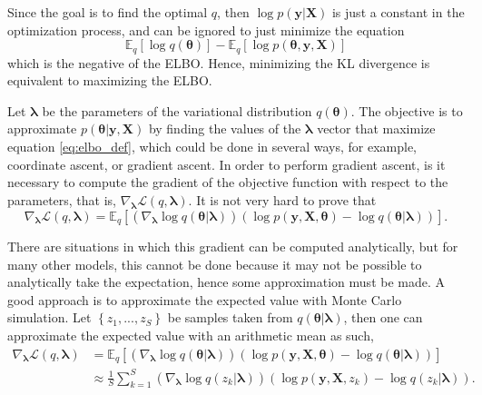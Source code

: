Since the goal is to find the optimal $q$, then $\log p(\boldsymbol{y} | \boldsymbol{X})$ is just a constant in the optimization process, and can be ignored to just minimize the equation
\begin{equation}
  \mathbb{E}_q \left[ \log  q(\boldsymbol{\theta}) \right] - \mathbb{E}_q \left[ \log p(\boldsymbol{\theta}, \boldsymbol{y}, \boldsymbol{X}) \right]
\end{equation}
which is the negative of the ELBO. Hence, minimizing the KL divergence is equivalent to maximizing the ELBO.

Let $\boldsymbol{\lambda}$ be the parameters of the variational distribution $q(\boldsymbol{\theta})$. The objective is to approximate $p(\boldsymbol{\theta} | \boldsymbol{y}, \boldsymbol{X})$ by finding the values of the $\boldsymbol{\lambda}$ vector that maximize equation \eqref{eq:elbo_def}, which could be done in several ways, for example, coordinate ascent, or gradient ascent. In order to perform gradient ascent, is it necessary to compute the gradient of the objective function with respect to the parameters, that is, $\nabla_{\boldsymbol{\lambda}} \mathcal{L}(q, \boldsymbol{\lambda})$. It is not very hard to prove that
\begin{equation}
  \label{eq:ELBO_gradient}
  \nabla_{\boldsymbol{\lambda}} \mathcal{L}(q, \boldsymbol{\lambda}) =
  \mathbb{E}_q \left[ \left( \nabla_{\boldsymbol{\lambda}} \log q(\boldsymbol{\theta} | \boldsymbol{\lambda}) \right) \left( \log p(\boldsymbol{y}, \boldsymbol{X}, \boldsymbol{\theta}) - \log q(\boldsymbol{\theta} | \boldsymbol{\lambda}) \right) \right].
\end{equation}

There are situations in which this gradient can be computed analytically, but for many other models, this cannot be done because it may not be possible to analytically take the expectation, hence some approximation must be made. A good approach is to approximate the expected value with Monte Carlo simulation. Let $\left\{ z_1, ..., z_S \right\}$ be samples taken from $q(\boldsymbol{\theta} | \boldsymbol{\lambda})$, then one can approximate the expected value with an arithmetic mean as such,
\begin{equation}
  \begin{split}
  \nabla_{\boldsymbol{\lambda}} \mathcal{L}(q, \boldsymbol{\lambda}) &=
  \mathbb{E}_q \left[ \left( \nabla_{\boldsymbol{\lambda}} \log q(\boldsymbol{\theta} | \boldsymbol{\lambda}) \right) \left( \log p(\boldsymbol{y}, \boldsymbol{X}, \boldsymbol{\theta}) - \log q(\boldsymbol{\theta} | \boldsymbol{\lambda}) \right) \right] \\
  & \approx \frac{1}{S} \sum_{k = 1}^S \left( \nabla_{\boldsymbol{\lambda}} \log q(z_k | \boldsymbol{\lambda}) \right) \left( \log p(\boldsymbol{y}, \boldsymbol{X}, z_k) - \log q(z_k | \boldsymbol{\lambda}) \right).
  \end{split}
\end{equation}

